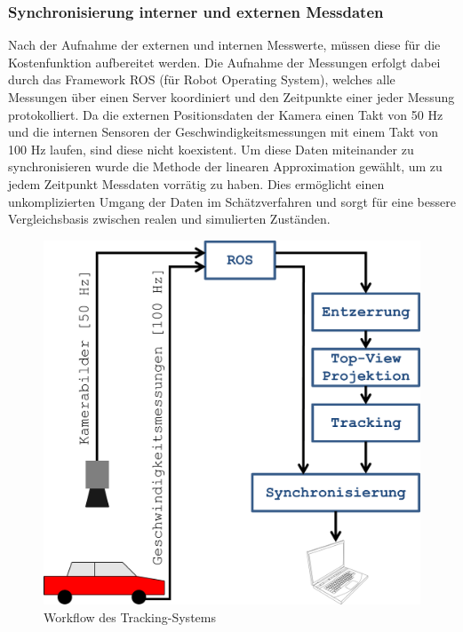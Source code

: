 \subsubsection{Synchronisierung interner und externen Messdaten}
Nach der Aufnahme der externen und internen Messwerte, müssen diese für die Kostenfunktion aufbereitet werden. Die Aufnahme der Messungen erfolgt dabei durch das Framework ROS (für Robot Operating System), welches alle Messungen über einen Server koordiniert und den Zeitpunkte einer jeder Messung protokolliert. Da die externen Positionsdaten der Kamera einen Takt von 50 Hz und die internen Sensoren der Geschwindigkeitsmessungen mit einem Takt von 100 Hz laufen, sind diese nicht koexistent. Um diese Daten miteinander zu synchronisieren wurde die Methode der linearen Approximation gewählt, um zu jedem Zeitpunkt Messdaten vorrätig zu haben. Dies ermöglicht einen unkomplizierten Umgang der Daten im Schätzverfahren und sorgt für eine bessere Vergleichsbasis zwischen realen und simulierten Zuständen. \\
\begin{figure}[H]
\centering
\includegraphics[scale=0.65]{Bilder/Workflow.png} 
\caption{Workflow des Tracking-Systems}
\label{fig:Track}
\end{figure}
